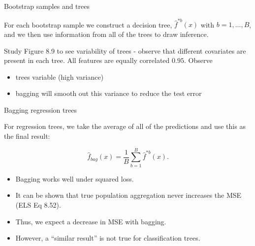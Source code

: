 \documentclass[
  ignorenonframetext,
]{beamer}
\providecommand{\tightlist}{%
  \setlength{\itemsep}{0pt}\setlength{\parskip}{0pt}}
\begin{document}
\begin{frame}

\begin{block}{Bootstrap samples and trees}

For each bootstrap sample we construct a decision tree,
\(\hat{f}^{*b}(x)\) with \(b=1,...,B\), and we then use information from
all of the trees to draw inference.

Study Figure 8.9 to see variability of trees - observe that different
covariates are present in each tree. All features are equally correlated
\(0.95\). Observe

\begin{itemize}
\tightlist
\item
  trees variable (high variance)
\item
  bagging will smooth out this variance to reduce the test error
\end{itemize}

\end{block}

\end{frame}

\begin{frame}

\begin{block}{Bagging regression trees}

For regression trees, we take the average of all of the predictions and
use this as the final result:

\[
\hat{f}_{bag}(x)=\frac{1}{B}\sum_{b=1}^B \hat{f}^{*b}(x).
\]

\begin{itemize}
\tightlist
\item
  Bagging works well under squared loss.
\item
  It can be shown that true population aggregation never increases the
  MSE (ELS Eq 8.52).
\item
  Thus, we expect a decrease in MSE with bagging.
\item
  However, a ``similar result'' is not true for classification trees.
\end{itemize}

\end{block}

\end{frame}
\end{document}

